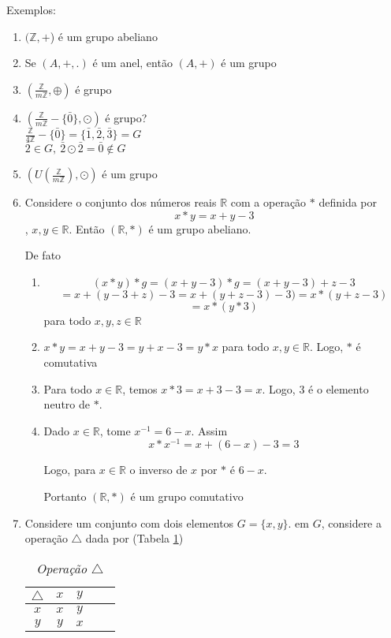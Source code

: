 Exemplos:
\begin{enumerate}
\item $(\mathbb{Z},+$) {\'e} um grupo abeliano
\item Se $(A,+,.)$ {\'e} um anel, ent{\~a}o $(A,+)$ {\'e} um grupo
\item $\left(\displaystyle\frac{\mathbb{Z}}{m\mathbb{Z}},\oplus\right)$ {\'e} grupo
\item $\left(\displaystyle\frac{\mathbb{Z}}{m\mathbb{Z}}-\{\bar{0}\},\odot\right)$ {\'e} grupo?\\
$\displaystyle\frac{\mathbb{Z}}{4\mathbb{Z}}-\{\bar{0}\}=\{\bar{1},\bar{2},\bar{3}\}=G$\\
$\bar{2}\in G,\ \bar{2}\odot\bar{2}=\bar{0}\notin G$
\item $\left(U\left(\displaystyle\frac{\mathbb{Z}}{m\mathbb{Z}}\right),\odot\right)$ {\'e} um grupo\\
\item Considere o conjunto dos n{\'u}meros reais $\mathbb{R}$ com a opera{\c c}{\~a}o $*$ definida por \[x*y=x+y-3\], $x,y\in\mathbb{R}$. Ent{\~a}o $(\mathbb{R},*)$ {\'e} um grupo abeliano.

De fato
\begin{enumerate}
\item \[(x*y)*g=(x+y-3)*g=(x+y-3)+z-3\]
\[=x+(y-3+z)-3=x+(y+z-3)-3)=x*(y+z-3)\]
\[=x*(y*3)\] para todo $x,y,z\in \mathbb{R}$
\item $x*y=x+y-3=y+x-3=y*x$ para todo $x,y\in\mathbb{R}$. Logo, $*$ {\'e} comutativa
\item Para todo $x\in\mathbb{R}$, temos $x*3=x+3-3=x$. Logo, 3 {\'e} o elemento neutro de $*$.
\item Dado $x\in\mathbb{R}$, tome $x^{-1}=6-x$. Assim \[x*x^{-1}=x+(6-x)-3=3\]

Logo, para $x\in\mathbb{R}$ o inverso de $x$ por $*$ {\'e} $6-x$.

Portanto $(\mathbb{R}, *)$ {\'e} um grupo comutativo
\end{enumerate}
\item Considere um conjunto com dois elementos $G=\{x,y\}$. em $G$, considere a opera{\c c}{\~a}o $\triangle$ dada por (Tabela \ref{6})
\begin{table}[h]
   \centering 
   \setlength{\arrayrulewidth}{0,5\arrayrulewidth}
   \caption{\it Opera{\c c}{\~a}o $\triangle$}
   \begin{tabular}{|c|c|c|c|c|} 
      \hline
      $\triangle$ & $x$ & $y$ \\
     \hline
      $x$ & $x$ & $y$ \\
      \hline
      $y$ & $y$ & $x$ \\
      \hline
   \end{tabular}
\label{6}
\end{table}


\end{enumerate}
